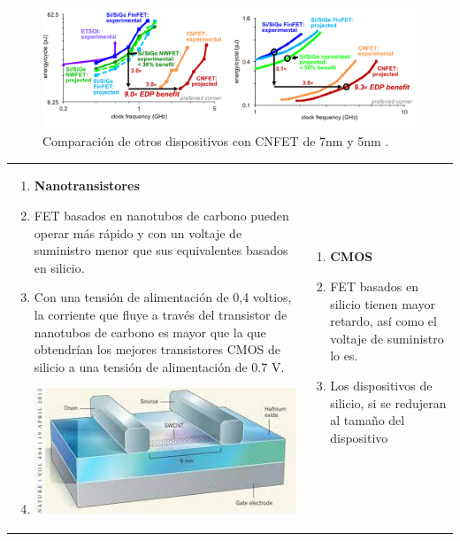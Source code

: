 \documentclass[conference]{IEEEtran} %
\begin{document}
	\begin{figure}[h!]
		\centering
		\includegraphics[width=15cm]{IMAGENES/img14}
		\caption{Comparación de otros dispositivos con CNFET de 7nm y 5nm \cite{UnderstandingEnergyEfficiency2018} .}
		\label{img14}
	\end{figure}



	\begin{table}
		\centering
		\begin{tabular}{|p{}|p{}|}
			\hline
			\begin{enumerate}
				\item[]\textbf{Nanotransistores}
				\item FET basados en nanotubos de carbono pueden operar más rápido y con un
				voltaje de suministro menor que sus equivalentes basados en silicio.
				\item Con una tensión de alimentación de 0,4 voltios, la corriente que fluye a través del transistor de nanotubos de carbono es mayor que la que obtendrían los mejores transistores CMOS de silicio a una tensión de alimentación de 0.7 V.
				\vspace{3mm}
				\item[] \hspace{10mm}\includegraphics[scale=0.3]{IMAGENES/image1.jpg}
			\end{enumerate} &
			\begin{enumerate}
				\item[]\textbf{CMOS}
				\item FET basados en silicio tienen mayor retardo, así como el voltaje de
				suministro lo es.
				\item Los dispositivos de silicio, si se redujeran al tamaño del dispositivo

\end{enumerate}
\end{tabular}
\end{table}
\end{document}

